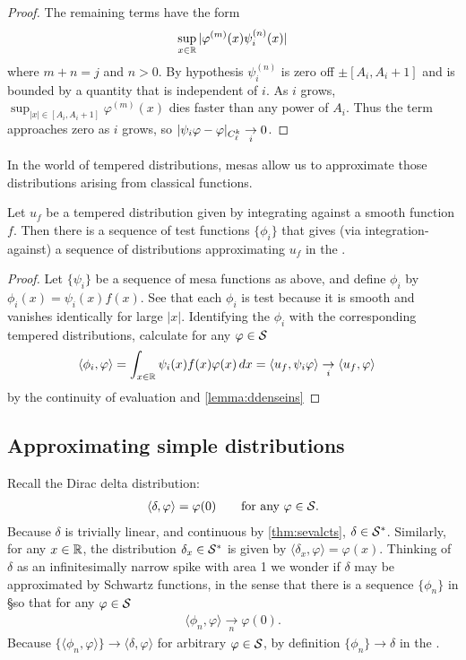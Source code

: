 \begin{proof}
      The remaining terms have the form
      \begin{align*}
        \sup_{x\in\R} |\varphi^{(m)}(x)\psi_i^{(n)}(x)|
      \end{align*}
      where $m+n=j$ and $n>0$.
      By hypothesis $\psi_i^{(n)}$ is zero off $\pm[A_i,A_i+1]$ and is bounded by a quantity that is independent of $i$.
      As $i$ grows, $\sup_{|x|\in[A_i,A_i+1]}\varphi^{(m)}(x)$ dies faster than any power of $A_i$.
      Thus the term approaches zero as $i$ grows, so $|\psi_i\varphi-\varphi|_\Ckl \underset{i}{\rightarrow}0$.
    \end{proof}
    In the world of tempered distributions, mesas allow us to approximate those distributions arising from classical functions.
    \begin{lemma}
      \label{lemma:ddenseinssfromsmooth}
      Let $u_f$ be a tempered distribution given by integrating against a smooth function $f$.
      Then there is a sequence of test functions $\{\phi_i\}$ that gives (via integration-against) a sequence of distributions approximating $u_f$ in the \ws.
    \end{lemma}
    \begin{proof}
      Let $\{\psi_i\}$ be a sequence of mesa functions as above, and define $\phi_i$ by $\phi_i(x) = \psi_i(x)f(x)$.
      See that each $\phi_i$ is test because it is smooth and vanishes identically for large $|x|$.
      Identifying the $\phi_i$ with the corresponding tempered distributions, calculate for any $\varphi\in\S$
      \begin{align*}
        \langle \phi_i, \varphi\rangle
        &= \int_{x\in\R} \psi_i(x)f(x)\varphi(x)\,dx
        = \langle u_f, \psi_i\varphi\rangle
        \underset{i}{\rightarrow} \langle u_f, \varphi\rangle
      \end{align*}
      by the continuity of evaluation and \cref{lemma:ddenseins}
    \end{proof}

  \subsection{Approximating simple distributions}
    Recall the Dirac delta distribution:
    \begin{gather*}
      \langle\delta,\varphi\rangle = \varphi(0)
      \qquad\text{for any }\varphi\in\S \text{.}
    \end{gather*}
    Because $\delta$ is trivially linear, and continuous by \cref{thm:sevalcts}, $\delta\in\SS$.
    Similarly, for any $x\in\R$, the distribution $\delta_x\in\SS$ is given by $\langle\delta_x,\varphi\rangle=\varphi(x)$.
    Thinking of $\delta$ as an infinitesimally narrow spike with area 1 we wonder if $\delta$ may be approximated by Schwartz functions, in the sense that there is a sequence $\{\phi_n\}$ in \S so that for any $\varphi\in\S$
    \begin{align*}
      \langle \phi_n, \varphi\rangle \underset{n}{\longrightarrow} \varphi(0)\text{.}
    \end{align*}
    Because $\{\langle\phi_n,\varphi\rangle\}\rightarrow\langle\delta,\varphi\rangle$ for arbitrary $\varphi\in\S$, by definition $\{\phi_n\}\rightarrow\delta$ in the \ws.

